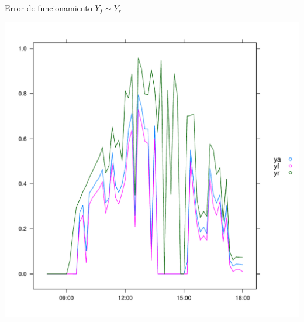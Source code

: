 \documentclass[aspectratio=169, usenames,svgnames,dvipsnames]{beamer}
\begin{document}
\begin{frame}[label={sec:org9c8f6e2}]{Error de funcionamiento \(Y_f \sim Y_r\)}
\begin{center}
\includegraphics[height=0.95\textheight]{../figs/ErrorYf.pdf}
\end{center}
\end{frame}
\end{document}

